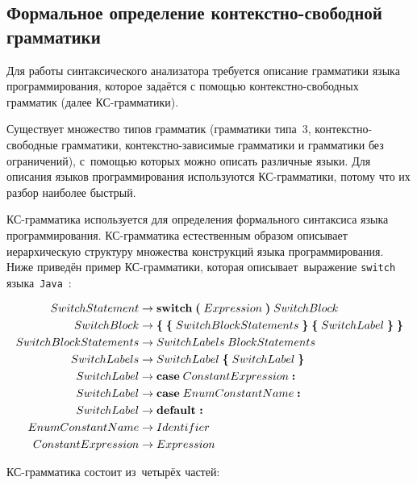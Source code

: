 \subsection{Формальное определение контекстно-свободной грамматики} \label{sub114}

Для работы синтаксического анализатора требуется описание грамматики языка программирования, которое задаётся с помощью контекстно-свободных грамматик (далее КС-грамматики).

Существует множество типов грамматик (грамматики типа~3, контекстно-свободные грамматики, контекстно-зависимые грамматики и грамматики без ограничений), с~помощью которых можно описать различные языки. Для описания языков программирования используются КС-грамматики, потому что их разбор наиболее быстрый.

КС-грамматика используется для определения формального синтаксиса языка программирования. КС-грамматика естественным образом описывает иерархическую структуру множества конструкций языка программирования. Ниже приведён пример КС-грамматики, которая описывает~выражение \texttt{switch} языка~\texttt{Java}~\cite{web3}:

\begin{align*}
SwitchStatement &\to \textbf{switch}\;\textbf{(}\; Expression\; \textbf{)}\; SwitchBlock \\
SwitchBlock &\to \textbf{\{}\; \textbf{\{}\;SwitchBlockStatements\;\textbf{\}}\; \textbf{\{}\;SwitchLabel\;\textbf{\}}\; \textbf{\}} \\
SwitchBlockStatements &\to SwitchLabels\; BlockStatements \\
SwitchLabels &\to SwitchLabel\; \textbf{\{}\;SwitchLabel\;\textbf{\}} \\
SwitchLabel &\to \textbf{case}\; ConstantExpression\; \textbf{:} \\
SwitchLabel &\to \textbf{case}\; EnumConstantName \;\textbf{:} \\
SwitchLabel &\to \textbf{default\;:} \\
EnumConstantName &\to Identifier \\
ConstantExpression &\to Expression
\end{align*}

КС-грамматика состоит из~четырёх частей:
 
